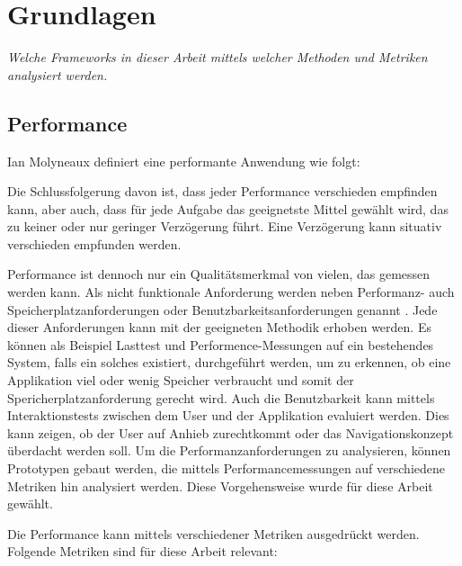 \documentclass[main.tex]{subfiles}
\begin{document}

\chapter{Grundlagen}

\textit{Welche Frameworks in dieser Arbeit mittels welcher Methoden und Metriken analysiert werden.}




\section{Performance} 

Ian Molyneaux definiert eine performante Anwendung wie folgt:\newline
\noindent 
{}\cite{molyneaux2014art}

Die Schlussfolgerung davon ist, dass jeder Performance verschieden empfinden kann, aber auch, dass für jede Aufgabe das geeignetste Mittel gewählt wird, das zu keiner oder nur geringer Verzögerung führt. Eine Verzögerung kann situativ verschieden empfunden werden.

Performance ist dennoch nur ein Qualitätsmerkmal von vielen, das gemessen werden kann. Als nicht funktionale Anforderung werden neben Performanz- auch Speicherplatzanforderungen oder Benutzbarkeitsanforderungen genannt \cite[S. 120]{sommerville_2012}. Jede dieser Anforderungen kann mit der geeigneten Methodik erhoben werden. Es können als Beispiel Lasttest und Performence-Messungen auf ein bestehendes System, falls ein solches existiert, durchgeführt werden, um zu erkennen, ob eine Applikation viel oder wenig Speicher verbraucht und somit der Spericherplatzanforderung gerecht wird. Auch die Benutzbarkeit kann mittels Interaktionstests zwischen dem User und der Applikation evaluiert werden. Dies kann zeigen, ob der User auf Anhieb zurechtkommt oder das Navigationskonzept überdacht werden soll. Um die Performanzanforderungen zu analysieren, können Prototypen gebaut werden, die mittels Performancemessungen auf verschiedene Metriken hin analysiert werden. Diese Vorgehensweise wurde für diese Arbeit gewählt.

Die Performance kann mittels verschiedener Metriken ausgedrückt werden. Folgende Metriken sind für diese Arbeit relevant:
\end{document}
